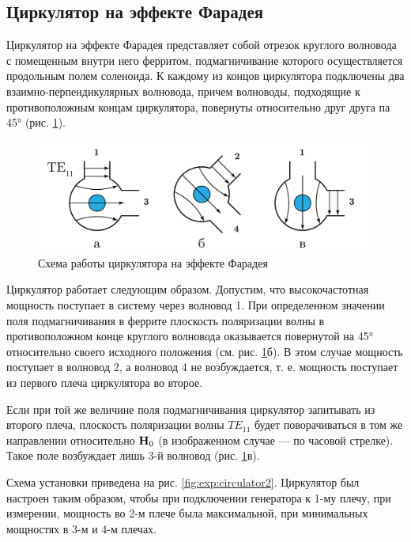 \subsection{Циркулятор на эффекте Фарадея}
Циркулятор на эффекте Фарадея представляет собой отрезок круглого волновода с помещенным внутри него ферритом,
подмагничивание которого осуществляется продольным полем соленоида. К каждому из концов циркулятора подключены два
взаимно-перпендикулярных волновода, причем волноводы, подходящие к противоположным концам циркулятора, повернуты
относительно друг друга па 45° (рис. \ref{fig:exp:circulator}).
\begin{figure}[h!]
    \centering
    \includegraphics[width = 0.8\linewidth]{imgs/circulator.pdf}
    \caption{Схема работы циркулятора на эффекте Фарадея}
    \label{fig:exp:circulator}
\end{figure}
Циркулятор работает следующим образом. Допустим, что высокочастотная мощность поступает в систему через волновод 1.
 При определенном значении поля
подмагничивания в феррите плоскость поляризации волны в противоположном конце круглого волновода оказывается
повернутой на 45° относительно своего исходного положения (см. рис. \ref{fig:exp:circulator}б). В этом случае мощность
поступает в волновод 2, а волновод 4 не возбуждается, т. е. мощность поступает из первого плеча циркулятора во второе.

Если при той же величине поля подмагничивания циркулятор запитывать из второго плеча, плоскость поляризации волны
$TE_{11}$ будет поворачиваться в том же направлении относительно $\textbf{H}_0$ (в изображенном случае — по часовой стрелке).
 Такое поле возбуждает лишь 3-й волновод (рис. \ref{fig:exp:circulator}в).

Схема установки приведена на рис. \ref{fig:exp:circulator2}.
Циркулятор был настроен таким образом, чтобы при подключении генератора к 1-му плечу, при измерении, мощность во 2-м
плече была максимальной, при минимальных мощностях в 3-м и 4-м плечах.

